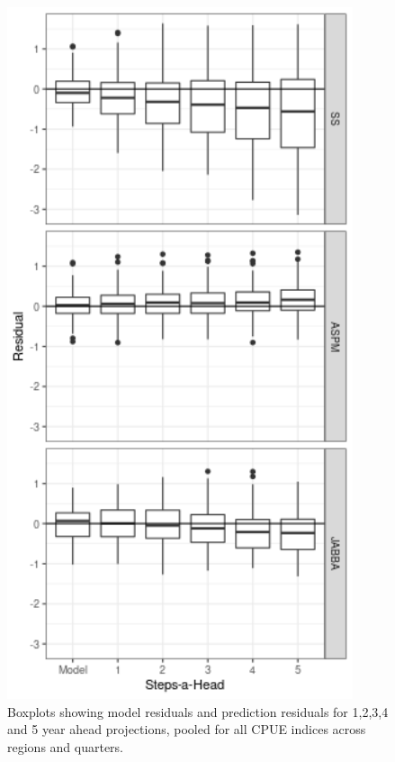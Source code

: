 \documentclass[12pt,halfline,a4paper,nonumbib]{ouparticle}
\begin{document}
\begin{figure}[htbp]
\centering
\includegraphics[width=4in]{figures/final-rsdl-1.png}
\caption{ Boxplots showing model residuals and prediction residuals for 1,2,3,4 and 5 year ahead projections, pooled for all CPUE indices across regions and quarters.}
\label{fig:residuals}
\end{figure}


%
\end{document}
